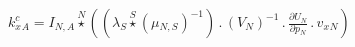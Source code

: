 \documentclass[border=2pt]{standalone}
\begin{document}
${{k^c_x}}{_{A}}={{I}}{_{N, A}} \stackrel{N}{\star} \left(\left({{\lambda}}{_{S}} \stackrel{S}{\star} \left( {{\mu}}{_{N, S}} \right)^{-1}\right) \, . \, \left( {V}{_{N}} \right)^{-1} \, . \, \frac{\partial{{U}{_{N}}}}{\partial{{p}{_{N}}}} \, . \, {{v_x}}{_{N}}\right)$
\end{document}
